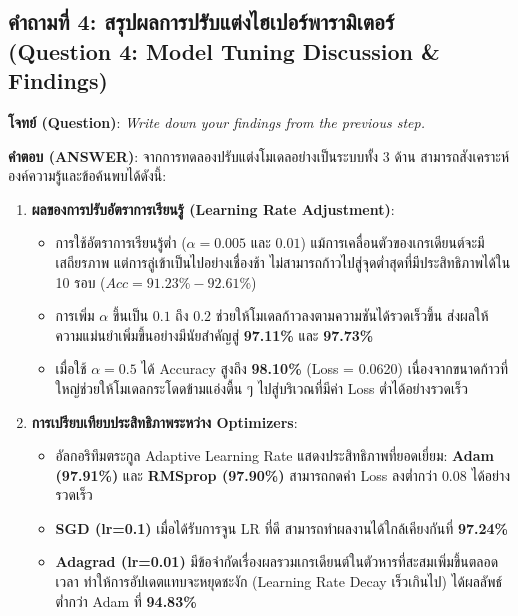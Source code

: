 \documentclass[12pt,a4paper]{article}
\begin{document}
\clearpage
\subsection*{คำถามที่ 4: สรุปผลการปรับแต่งไฮเปอร์พารามิเตอร์\\ \normalsize(Question 4: Model Tuning Discussion \& Findings)}

\begin{ansbox}
\textbf{โจทย์ (Question)}: \textit{Write down your findings from the previous step.}

\vspace{0.4em}
\textbf{คำตอบ (ANSWER)}:
จากการทดลองปรับแต่งโมเดลอย่างเป็นระบบทั้ง 3 ด้าน สามารถสังเคราะห์องค์ความรู้และข้อค้นพบได้ดังนี้:

\begin{enumerate}[leftmargin=18pt, itemsep=3pt]
    \item \textbf{ผลของการปรับอัตราการเรียนรู้ (Learning Rate Adjustment)}:
    \begin{itemize}
        \item การใช้อัตราการเรียนรู้ต่ำ ($\alpha = 0.005$ และ $0.01$) แม้การเคลื่อนตัวของเกรเดียนต์จะมีเสถียรภาพ แต่การลู่เข้าเป็นไปอย่างเชื่องช้า ไม่สามารถก้าวไปสู่จุดต่ำสุดที่มีประสิทธิภาพได้ใน 10 รอบ ($Acc = 91.23\% - 92.61\%$)
        \item การเพิ่ม $\alpha$ ขึ้นเป็น $0.1$ ถึง $0.2$ ช่วยให้โมเดลก้าวลงตามความชันได้รวดเร็วขึ้น ส่งผลให้ความแม่นยำเพิ่มขึ้นอย่างมีนัยสำคัญสู่ \textbf{97.11\%} และ \textbf{97.73\%}
        \item เมื่อใช้ $\alpha = 0.5$ ได้ Accuracy สูงถึง \textbf{98.10\%} (Loss = 0.0620) เนื่องจากขนาดก้าวที่ใหญ่ช่วยให้โมเดลกระโดดข้ามแอ่งตื้น ๆ ไปสู่บริเวณที่มีค่า Loss ต่ำได้อย่างรวดเร็ว
    \end{itemize}
    \item \textbf{การเปรียบเทียบประสิทธิภาพระหว่าง Optimizers}:
    \begin{itemize}
        \item อัลกอริทึมตระกูล Adaptive Learning Rate แสดงประสิทธิภาพที่ยอดเยี่ยม: \textbf{Adam (97.91\%)} และ \textbf{RMSprop (97.90\%)} สามารถกดค่า Loss ลงต่ำกว่า $0.08$ ได้อย่างรวดเร็ว
        \item \textbf{SGD (lr=0.1)} เมื่อได้รับการจูน LR ที่ดี สามารถทำผลงานได้ใกล้เคียงกันที่ \textbf{97.24\%}
        \item \textbf{Adagrad (lr=0.01)} มีข้อจำกัดเรื่องผลรวมเกรเดียนต์ในตัวหารที่สะสมเพิ่มขึ้นตลอดเวลา ทำให้การอัปเดตแทบจะหยุดชะงัก (Learning Rate Decay เร็วเกินไป) ได้ผลลัพธ์ต่ำกว่า Adam ที่ \textbf{94.83\%}

\end{itemize}
\end{enumerate}
\end{ansbox}
\end{document}

